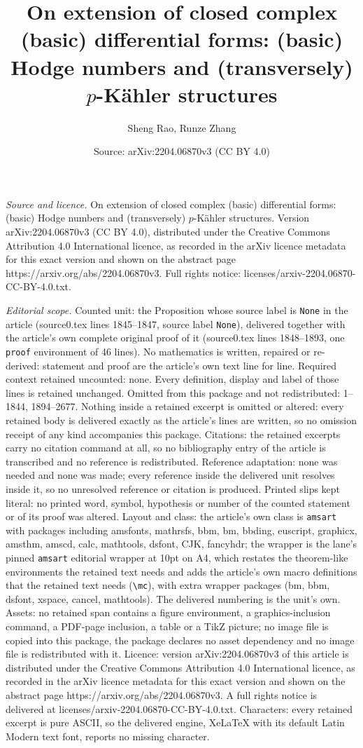 \documentclass[10pt,a4paper]{amsart}
\title[On extension of closed complex (basic) differential forms: (]{On extension of closed complex (basic) differential forms: (basic) Hodge numbers and (transversely) $p$-K\"ahler structures}
\author{Sheng Rao, Runze Zhang}
\date{Source: arXiv:2204.06870v3 (CC BY 4.0)}
\begin{document}
\maketitle

\noindent\emph{Source and licence.} On extension of closed complex (basic) differential forms: (basic) Hodge numbers and (transversely) $p$-K\"ahler structures. Version arXiv:2204.06870v3 (CC BY 4.0), distributed under the Creative Commons Attribution 4.0 International licence, as recorded in the arXiv licence metadata for this exact version and shown on the abstract page https://arxiv.org/abs/2204.06870v3. Full rights notice: licenses/arxiv-2204.06870-CC-BY-4.0.txt.\par\smallskip

\noindent\textit{Editorial scope.} Counted unit: the Proposition whose source label is \texttt{None} in the article (source0.tex lines 1845--1847, source label \texttt{None}), delivered together with the article's own complete original proof of it (source0.tex lines 1848--1893, one \texttt{proof} environment of 46 lines). No mathematics is written, repaired or re-derived: statement and proof are the article's own text line for line. Required context retained uncounted: none. Every definition, display and label of those lines is retained unchanged. Omitted from this package and not redistributed: 1--1844, 1894--2677. Nothing inside a retained excerpt is omitted or altered: every retained body is delivered exactly as the article's lines are written, so no omission receipt of any kind accompanies this package. Citations: the retained excerpts carry no citation command at all, so no bibliography entry of the article is transcribed and no reference is redistributed. Reference adaptation: none was needed and none was made; every reference inside the delivered unit resolves inside it, so no unresolved reference or citation is produced. Printed slips kept literal: no printed word, symbol, hypothesis or number of the counted statement or of its proof was altered. Layout and class: the article's own class is \texttt{amsart} with packages including amsfonts, mathrsfs, bbm, bm, bbding, euscript, graphicx, amsthm, amscd, calc, mathtools, dsfont, CJK, fancyhdr; the wrapper is the lane's pinned \texttt{amsart} editorial wrapper at 10pt on A4, which restates the theorem-like environments the retained text needs and adds the article's own macro definitions that the retained text needs (\texttt{\textbackslash mc}), with extra wrapper packages (bm, bbm, dsfont, xspace, cancel, mathtools). The delivered numbering is the unit's own. Assets: no retained span contains a figure environment, a graphics-inclusion command, a PDF-page inclusion, a table or a TikZ picture; no image file is copied into this package, the package declares no asset dependency and no image file is redistributed with it. Licence: version arXiv:2204.06870v3 of this article is distributed under the Creative Commons Attribution 4.0 International licence, as recorded in the arXiv licence metadata for this exact version and shown on the abstract page https://arxiv.org/abs/2204.06870v3. A full rights notice is delivered at licenses/arxiv-2204.06870-CC-BY-4.0.txt. Characters: every retained excerpt is pure ASCII, so the delivered engine, XeLaTeX with its default Latin Modern text font, reports no missing character.
\end{document}
